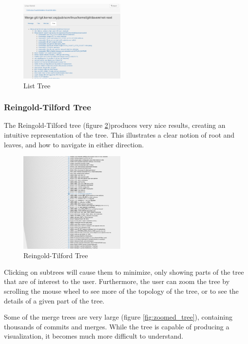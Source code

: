 \documentclass[conference, draftclsnofoot, draft]{IEEEtran}
\begin{document}
\begin{figure}
        \centering
        \includegraphics[width=0.47\textwidth]{figures/list_tree.png}
        \caption{List Tree}
        \label{fig:list_tree}
\end{figure}

\subsubsection{Reingold-Tilford Tree}

The Reingold-Tilford tree (figure \ref{fig:tree})produces very nice results,
creating an intuitive representation of the tree. This illustrates a clear notion of
root and leaves, and how to navigate in either direction.

\begin{figure}
        \centering
        \includegraphics[width=0.47\textwidth]{figures/tree_view.png}
        \caption{Reingold-Tilford Tree}
        \label{fig:tree}
\end{figure}

Clicking on subtrees will cause them to minimize, only showing parts of the tree
that are of interest to the user. Furthermore, the user can zoom the tree by
scrolling the mouse wheel to see more of the topology of the tree, or to see the
details of a given part of the tree.

Some of the merge trees are very large (figure \ref{fig:zoomed_tree}), containing
thousands of commits and merges. While the tree is capable of producing a
visualization, it becomes much more difficult to understand.
\end{document}
